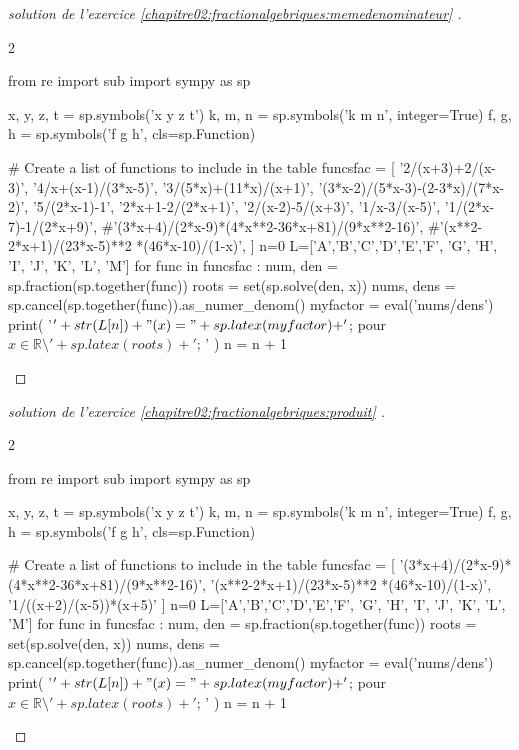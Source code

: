 \documentclass[main.tex]{subfiles}
\begin{document}
\begin{proof}[solution de l'exercice \ref{chapitre02:fractionalgebriques:memedenominateur} ] \hfill 
\begin{multicols}{2}  
\begin{pycode} 
from re import sub
import sympy as sp

x, y, z, t = sp.symbols('x y z t')
k, m, n = sp.symbols('k m n', integer=True)
f, g, h = sp.symbols('f g h', cls=sp.Function)

# Create a list of functions to include in the table
funcsfac = [
'2/(x+3)+2/(x-3)',
'4/x+(x-1)/(3*x-5)',
'3/(5*x)+(11*x)/(x+1)',
'(3*x-2)/(5*x-3)-(2-3*x)/(7*x-2)',
'5/(2*x-1)-1',
'2*x+1-2/(2*x+1)',
'2/(x-2)-5/(x+3)',
'1/x-3/(x-5)',
'1/(2*x-7)-1/(2*x+9)',
#'(3*x+4)/(2*x-9)*(4*x**2-36*x+81)/(9*x**2-16)', 
#'(x**2-2*x+1)/(23*x-5)**2 *(46*x-10)/(1-x)',
]
n=0
L=['A','B','C','D','E','F', 'G', 'H', 'I', 'J', 'K', 'L', 'M']
for func in funcsfac :
	num, den =  sp.fraction(sp.together(func))
	roots = set(sp.solve(den, x))
	nums, dens = sp.cancel(sp.together(func)).as_numer_denom()
	myfactor =  eval('nums/dens')
	print( '$'+ str(L[n])  + "(x)=" + sp.latex(myfactor) + '$; pour $x\in\mathbb{R}\setminus'+ sp.latex(roots ) + '$; \n' )
	n     = n + 1
\end{pycode}
\end{multicols}
\end{proof}  
\begin{proof}[solution de l'exercice \ref{chapitre02:fractionalgebriques:produit} ] \hfill 
\begin{multicols}{2}  
\begin{pycode} 
from re import sub
import sympy as sp

x, y, z, t = sp.symbols('x y z t')
k, m, n = sp.symbols('k m n', integer=True)
f, g, h = sp.symbols('f g h', cls=sp.Function)

# Create a list of functions to include in the table
funcsfac = [ 
'(3*x+4)/(2*x-9)*(4*x**2-36*x+81)/(9*x**2-16)', 
'(x**2-2*x+1)/(23*x-5)**2 *(46*x-10)/(1-x)',
'1/((x+2)/(x-5))*(x+5)'
]
n=0
L=['A','B','C','D','E','F', 'G', 'H', 'I', 'J', 'K', 'L', 'M']
for func in funcsfac :
	num, den =  sp.fraction(sp.together(func))
	roots = set(sp.solve(den, x))
	nums, dens = sp.cancel(sp.together(func)).as_numer_denom()
	myfactor =  eval('nums/dens')
	print( '$'+ str(L[n])  + "(x)=" + sp.latex(myfactor) + '$; pour $x\in\mathbb{R}\setminus'+ sp.latex(roots ) + '$; \n' )
	n     = n + 1
\end{pycode}
\end{multicols}
\end{proof}  
\end{document}
